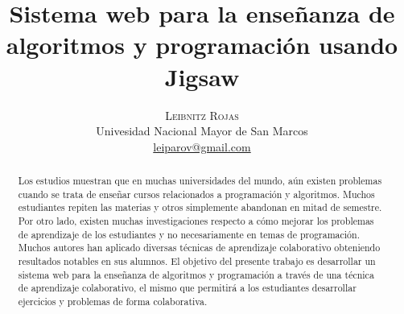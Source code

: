 \documentclass[twoside]{article}
\title{\vspace{-15mm}\fontsize{24pt}{10pt}\selectfont\textbf{Sistema web para la enseñanza de algoritmos y programación usando Jigsaw}} %
\author{
\large
\textsc{Leibnitz Rojas}\\[2mm] %
\normalsize Univesidad Nacional Mayor de San Marcos \\ %
\normalsize \href{mailto:leiparov@gmail.com}{leiparov@gmail.com} %
\vspace{-5mm}
}
\date{}
\begin{document}
\maketitle %

\thispagestyle{fancy} %


\begin{abstract}

Los estudios muestran que en muchas universidades del mundo, aún existen problemas cuando se trata de enseñar cursos relacionados a programación y algoritmos. Muchos estudiantes repiten las materias y otros simplemente abandonan en mitad de semestre. Por otro lado, existen muchas investigaciones respecto a cómo mejorar los problemas de aprendizaje de los estudiantes y no necesariamente en temas de programación. Muchos autores han aplicado diversas técnicas de aprendizaje colaborativo obteniendo resultados notables en sus alumnos. El objetivo del presente trabajo es desarrollar un sistema web para la enseñanza de algoritmos y programación a través de una técnica de aprendizaje colaborativo, el mismo que permitirá a los estudiantes desarrollar ejercicios y problemas de forma colaborativa.
\end{abstract}

\end{document}
